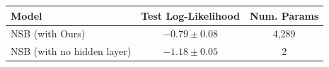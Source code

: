 \begin{tabular}{lcc}
\toprule
Model & Test Log-Likelihood & Num. Params \\
\midrule
NSB (with Ours) & \textbf{$-0.79 \pm 0.08$} & 4,289 \\
NSB (with no hidden layer) & $-1.18 \pm 0.05$ & 2 \\
\bottomrule
\end{tabular}